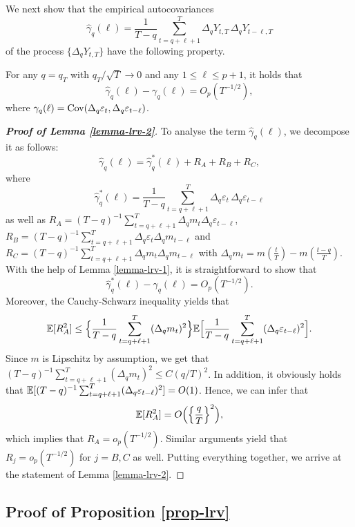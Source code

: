 We next show that the empirical autocovariances 
\[ \widehat{\gamma}_q(\ell) = \frac{1}{T-q} \sum_{t=q+\ell+1}^T \Delta_q Y_{t,T} \, \Delta_q Y_{t-\ell,T} \]
of the process $\{ \Delta_q Y_{t,T} \}$ have the following property. 
\begin{lemmaA}\label{lemma-lrv-2}
For any $q = q_T$ with $q_T/\sqrt{T} \rightarrow 0$ and any $1 \le \ell \le p + 1$, it holds that  
\[ \widehat{\gamma}_q(\ell) - \gamma_q(\ell) = O_p(T^{-1/2}), \]
where $\gamma_q(\ell) = \textnormal{Cov}(\Delta_q \varepsilon_t,\Delta_q \varepsilon_{t-\ell})$. 
\end{lemmaA}
\begin{proof}[\textnormal{\textbf{Proof of Lemma \ref{lemma-lrv-2}}}] 
To analyse the term $\widehat{\gamma}_q(\ell)$, we decompose it as follows:  
\[ \widehat{\gamma}_q(\ell) = \widehat{\gamma}_q^*(\ell) + R_A + R_B + R_C, \]
where 
\[ \widehat{\gamma}_q^*(\ell) =  \frac{1}{T-q} \sum\limits_{t=q+\ell+1}^T \Delta_q \varepsilon_t \, \Delta_q \varepsilon_{t-\ell} \]
as well as $R_A = (T-q)^{-1} \sum_{t=q+\ell+1}^T \Delta_q m_t \Delta_q \varepsilon_{t-\ell}$, $R_B = (T-q)^{-1} \sum_{t=q+\ell+1}^T \Delta_q \varepsilon_t \Delta_q m_{t-\ell}$ and $R_C = (T-q)^{-1} \sum_{t=q+\ell+1}^T \Delta_q m_t \Delta_q m_{t-\ell}$ with $\Delta_q m_t = m(\frac{t}{T}) - m(\frac{t-q}{T})$. With the help of Lemma \ref{lemma-lrv-1}, it is straightforward to show that  
\[ \widehat{\gamma}_q^*(\ell) - \gamma_q(\ell) = O_p(T^{-1/2}). \]
Moreover, the Cauchy-Schwarz inequality yields that 
\[ \mathbb{E} [R_A^2] \le \Big\{ \frac{1}{T-q} \sum\limits_{t=q+\ell+1}^T (\Delta_q m_t)^2 \Big\} \mathbb{E} \Big[ \frac{1}{T-q} \sum\limits_{t=q+\ell+1}^T (\Delta_q \varepsilon_{t-\ell})^2 \Big]. \]
Since $m$ is Lipschitz by assumption, we get that $(T-q)^{-1} \sum_{t=q+\ell+1}^T (\Delta_q m_t)^2 \le C (q/T)^2$. In addition, it obviously holds that 
$\mathbb{E} [ (T-q)^{-1} \sum_{t=q+\ell+1}^T (\Delta_q \varepsilon_{t-\ell})^2 ] = O(1)$.  
Hence, we can infer that 
\[ \mathbb{E} [R_A^2] = O\Big( \Big\{ \frac{q}{T} \Big\}^2 \Big), \]
which implies that $R_A = o_p(T^{-1/2})$. Similar arguments yield that $R_j = o_p(T^{-1/2})$ for $j = B,C$ as well. Putting everything together, we arrive at the statement of Lemma \ref{lemma-lrv-2}. 
\end{proof} 



\subsection*{Proof of Proposition \ref{prop-lrv}}


